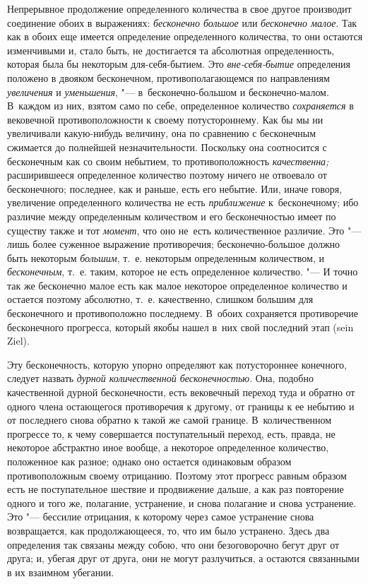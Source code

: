 Непрерывное продолжение определенного количества в свое другое производит
соединение обоих в выражениях: {\em бесконечно большое} или {\em бесконечно
малое}. Так как в обоих еще имеется определение определенного количества, то
они остаются изменчивыми и, стало быть, не достигается та абсолютная
определенность, которая была бы некоторым для-себя-бытием. Это
{\em вне-себя-бытие} определения положено в двояком бесконечном,
противополагающемся по направлениям {\em увеличения} и {\em уменьшения}, "---
в~бесконечно-большом и бесконечно-малом. В~каждом из них, взятом само по себе,
определенное количество {\em сохраняется} в вековечной противоположности к
своему потустороннему. Как бы мы ни увеличивали какую-нибудь величину, она по
сравнению с бесконечным сжимается до полнейшей незначительности. Поскольку она
соотносится с бесконечным как со своим небытием, то противоположность
{\em качественна;} расширившееся определенное количество поэтому ничего не
отвоевало от бесконечного; последнее, как и раньше, есть его небытие. Или,
иначе говоря, увеличение определенного количества не есть {\em приближение}
к~бесконечному; ибо различие между определенным количеством и его
бесконечностью имеет по существу также и тот {\em момент}, что оно не~есть
количественное различие. Это "--- лишь более суженное выражение противоречия;
бесконечно-большое должно быть некоторым {\em большим}, т.~е. некоторым
определенным количеством, и {\em бесконечным}, т.~е. таким, которое не есть
определенное количество. "--- И точно так же бесконечно малое есть как малое
некоторое определенное количество и остается поэтому абсолютно, т.~е.
качественно, слишком большим для бесконечного и противоположно последнему.
В~обоих сохраняется противоречие бесконечного прогресса, который якобы нашел
в~них свой последний этап (sein Ziel).

Эту бесконечность, которую упорно определяют как потустороннее конечного,
следует назвать {\em дурной количественной бесконечностью}. Она, подобно
качественной дурной бесконечности, есть вековечный переход туда и обратно от
одного члена остающегося противоречия к другому, от границы к ее небытию и от
последнего снова обратно к такой же самой границе. В~количественном прогрессе
то, к чему совершается поступательный переход, есть, правда, не некоторое
абстрактно иное вообще, а некоторое определенное количество, положенное как
разное; однако оно остается одинаковым образом противоположным своему
отрицанию. Поэтому этот прогресс равным образом есть не поступательное шествие
и продвижение дальше, а как раз повторение одного и того же, полагание,
устранение, и снова полагание и снова устранение. Это "--- бессилие отрицания,
к которому через самое устранение снова возвращается, как продолжающееся, то,
что им было устранено. Здесь два определения так связаны между собою, что они
безоговорочно бегут друг от друга; и, убегая друг от друга, они не могут
разлучиться, а остаются связанными в их взаимном убегании.

